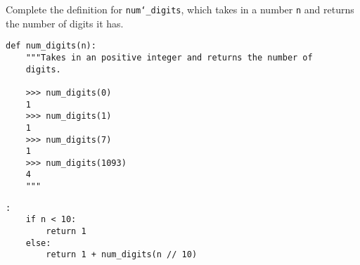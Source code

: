 \begin{blocksection}
\question Complete the definition for \texttt{num\char`_digits}, which takes in a number \texttt{n}
and returns the number of digits it has.

\begin{lstlisting}
def num_digits(n):
    """Takes in an positive integer and returns the number of
    digits.

    >>> num_digits(0)
    1
    >>> num_digits(1)
    1
    >>> num_digits(7)
    1
    >>> num_digits(1093)
    4
    """
\end{lstlisting}

\begin{solution}[1in]
\begin{lstlisting}:
    if n < 10:
        return 1
    else:
        return 1 + num_digits(n // 10)
\end{lstlisting}
\end{solution}
\end{blocksection}

